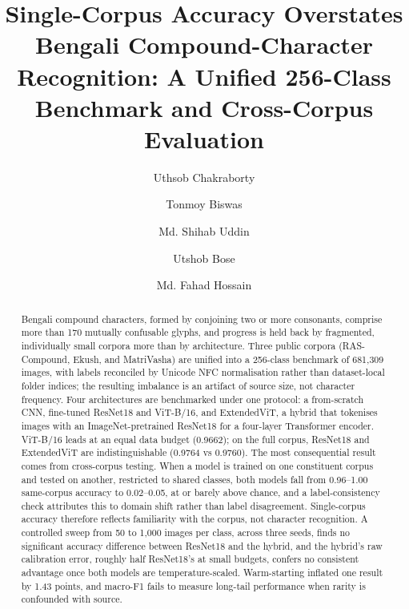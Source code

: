 \documentclass[5p,10pt]{elsarticle}
\begin{document}
\begin{frontmatter}

\title{Single-Corpus Accuracy Overstates Bengali Compound-Character Recognition: A Unified 256-Class Benchmark and Cross-Corpus Evaluation}

\author[inst1]{Uthsob Chakraborty}
\author[inst1]{Tonmoy Biswas}
\author[inst1]{Md. Shihab Uddin}
\author[inst2]{Utshob Bose}
\author[inst1]{Md. Fahad Hossain}

\address[inst1]{Department of Software Engineering, Daffodil International University, Daffodil Smart City, Birulia, Dhaka 1216, Bangladesh}
\address[inst2]{BRAC University, Kha 224, Pragati Sarani, Dhaka 1212, Bangladesh}

\begin{abstract}
Bengali compound characters, formed by conjoining two or more consonants, comprise more than 170 mutually confusable glyphs, and progress is held back by fragmented, individually small corpora more than by architecture. Three public corpora (RAS-Compound, Ekush, and MatriVasha) are unified into a 256-class benchmark of 681,309 images, with labels reconciled by Unicode NFC normalisation rather than dataset-local folder indices; the resulting imbalance is an artifact of source size, not character frequency. Four architectures are benchmarked under one protocol: a from-scratch CNN, fine-tuned ResNet18 and ViT-B/16, and ExtendedViT, a hybrid that tokenises images with an ImageNet-pretrained ResNet18 for a four-layer Transformer encoder. ViT-B/16 leads at an equal data budget (0.9662); on the full corpus, ResNet18 and ExtendedViT are indistinguishable (0.9764 vs 0.9760). The most consequential result comes from cross-corpus testing. When a model is trained on one constituent corpus and tested on another, restricted to shared classes, both models fall from 0.96--1.00 same-corpus accuracy to 0.02--0.05, at or barely above chance, and a label-consistency check attributes this to domain shift rather than label disagreement. Single-corpus accuracy therefore reflects familiarity with the corpus, not character recognition. A controlled sweep from 50 to 1,000 images per class, across three seeds, finds no significant accuracy difference between ResNet18 and the hybrid, and the hybrid's raw calibration error, roughly half ResNet18's at small budgets, confers no consistent advantage once both models are temperature-scaled. Warm-starting inflated one result by 1.43 points, and macro-F1 fails to measure long-tail performance when rarity is confounded with source.
\end{abstract}


\end{frontmatter}
\end{document}

